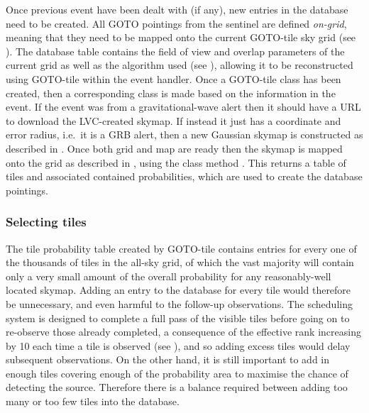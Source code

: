 \begin{colsection}
Once previous event have been dealt with (if any), new entries in the database need to be created. All GOTO pointings from the sentinel are defined \textit{on-grid}, meaning that they need to be mapped onto the current GOTO-tile sky grid (see ). The database  table contains the field of view and overlap parameters of the current grid as well as the algorithm used (see ), allowing it to be reconstructed using GOTO-tile within the event handler. Once a GOTO-tile  class has been created, then a corresponding  class is made based on the information in the event. If the event was from a gravitational-wave alert then it should have a URL to download the LVC-created skymap. If instead it just has a coordinate and error radius, i.e.\ it is a GRB alert, then a new Gaussian skymap is constructed as described in . Once both grid and map are ready then the skymap is mapped onto the grid as described in , using the class method . This returns a table of tiles and associated contained probabilities, which are used to create the database pointings. %

\subsubsection{Selecting tiles}

The tile probability table created by GOTO-tile contains entries for every one of the thousands of tiles in the all-sky grid, of which the vast majority will contain only a very small amount of the overall probability for any reasonably-well located skymap. Adding an entry to the database for every tile would therefore be unnecessary, and even harmful to the follow-up observations. The scheduling system is designed to complete a full pass of the visible tiles before going on to re-observe those already completed, a consequence of the effective rank increasing by 10 each time a tile is observed (see ), and so adding excess tiles would delay subsequent observations. On the other hand, it is still important to add in enough tiles covering enough of the probability area to maximise the chance of detecting the source. Therefore there is a balance required between adding too many or too few tiles into the database.


\end{colsection}
